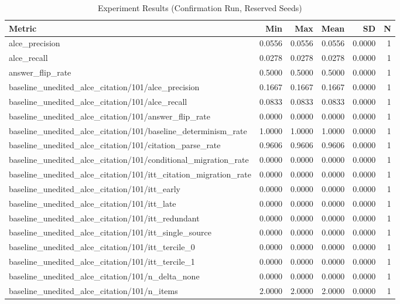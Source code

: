 \begin{table}[h]
\centering
\caption{Experiment Results (Confirmation Run, Reserved Seeds)}
\begin{tabular}{lrrrrr}
\hline
Metric & Min & Max & Mean & SD & N \\
\hline
alce_precision & 0.0556 & 0.0556 & 0.0556 & 0.0000 & 1 \\
alce_recall & 0.0278 & 0.0278 & 0.0278 & 0.0000 & 1 \\
answer_flip_rate & 0.5000 & 0.5000 & 0.5000 & 0.0000 & 1 \\
baseline_unedited_alce_citation/101/alce_precision & 0.1667 & 0.1667 & 0.1667 & 0.0000 & 1 \\
baseline_unedited_alce_citation/101/alce_recall & 0.0833 & 0.0833 & 0.0833 & 0.0000 & 1 \\
baseline_unedited_alce_citation/101/answer_flip_rate & 0.0000 & 0.0000 & 0.0000 & 0.0000 & 1 \\
baseline_unedited_alce_citation/101/baseline_determinism_rate & 1.0000 & 1.0000 & 1.0000 & 0.0000 & 1 \\
baseline_unedited_alce_citation/101/citation_parse_rate & 0.9606 & 0.9606 & 0.9606 & 0.0000 & 1 \\
baseline_unedited_alce_citation/101/conditional_migration_rate & 0.0000 & 0.0000 & 0.0000 & 0.0000 & 1 \\
baseline_unedited_alce_citation/101/itt_citation_migration_rate & 0.0000 & 0.0000 & 0.0000 & 0.0000 & 1 \\
baseline_unedited_alce_citation/101/itt_early & 0.0000 & 0.0000 & 0.0000 & 0.0000 & 1 \\
baseline_unedited_alce_citation/101/itt_late & 0.0000 & 0.0000 & 0.0000 & 0.0000 & 1 \\
baseline_unedited_alce_citation/101/itt_redundant & 0.0000 & 0.0000 & 0.0000 & 0.0000 & 1 \\
baseline_unedited_alce_citation/101/itt_single_source & 0.0000 & 0.0000 & 0.0000 & 0.0000 & 1 \\
baseline_unedited_alce_citation/101/itt_tercile_0 & 0.0000 & 0.0000 & 0.0000 & 0.0000 & 1 \\
baseline_unedited_alce_citation/101/itt_tercile_1 & 0.0000 & 0.0000 & 0.0000 & 0.0000 & 1 \\
baseline_unedited_alce_citation/101/n_delta_none & 0.0000 & 0.0000 & 0.0000 & 0.0000 & 1 \\
baseline_unedited_alce_citation/101/n_items & 2.0000 & 2.0000 & 2.0000 & 0.0000 & 1 \\

\end{tabular}
\end{table}

